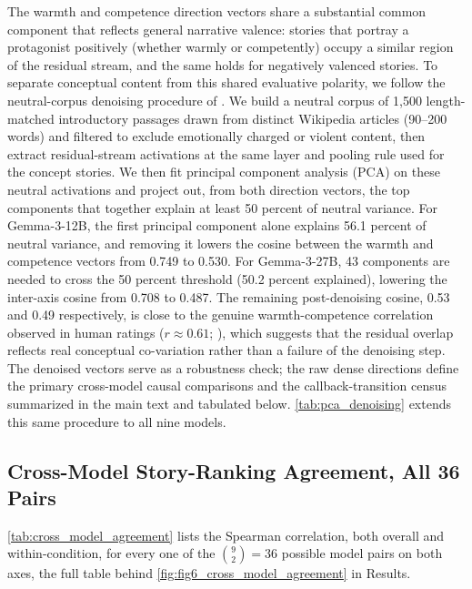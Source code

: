 \documentclass[twocolumn]{article}
\newcommand{\tabledir}{../../results/tables}
\begin{document}
\begin{appendices}
The warmth and competence direction vectors share a substantial common
component that reflects general narrative valence: stories that portray a
protagonist positively (whether warmly or competently) occupy a similar
region of the residual stream, and the same holds for negatively valenced
stories.
To separate conceptual content from this shared evaluative polarity, we
follow the neutral-corpus denoising procedure of \citet{sofroniew2026emotion}.
We build a neutral corpus of 1,500 length-matched introductory passages
drawn from distinct Wikipedia articles (90--200 words) and filtered to
exclude emotionally charged or violent content, then extract residual-stream
activations at the same layer and pooling rule used for the concept stories.
We then fit principal component analysis (PCA) on these neutral activations
and project out, from both direction vectors, the top components that
together explain at least 50 percent of neutral variance.
For Gemma-3-12B, the first principal component alone explains 56.1 percent
of neutral variance, and removing it lowers the cosine between the warmth
and competence vectors from 0.749 to 0.530.
For Gemma-3-27B, 43 components are needed to cross the 50 percent threshold
(50.2 percent explained), lowering the inter-axis cosine from 0.708 to 0.487.
The remaining post-denoising cosine, 0.53 and 0.49 respectively, is close to
the genuine warmth-competence correlation observed in human ratings
($r \approx 0.61$; \citealt{fiske2002model}), which suggests that the
residual overlap reflects real conceptual co-variation rather than a
failure of the denoising step.
The denoised vectors serve as a robustness check; the raw dense directions
define the primary cross-model causal comparisons and the callback-transition
census summarized in the main text and tabulated below.
\autoref{tab:pca_denoising} extends this same procedure to all nine models.



\subsection*{Cross-Model Story-Ranking Agreement, All 36 Pairs}

\autoref{tab:cross_model_agreement} lists the Spearman correlation, both
overall and within-condition, for every one of the $\binom{9}{2}=36$
possible model pairs on both axes, the full table behind
\autoref{fig:fig6_cross_model_agreement} in Results.




\end{appendices}
\end{document}
